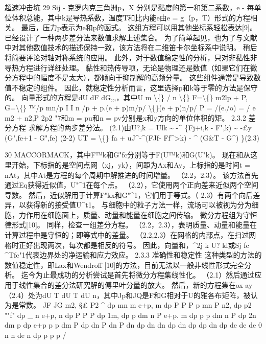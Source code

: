 \documentclass[UTF8,11pt,a4paper,openany,fontset=fandol]{ctexbook}
\begin{document}
超速冲击坑 29 Sij - 克罗内克三角洲p，X 分别是黏度的第一和第二系数，e - 每单位体积总能，其中k是导热系数，温度T和比内能e由e = g（p，T）形式的方程相关。 最后，压力p表示为e和p的函式。 这组方程可以用其他坐标系轻松表达[9]。 已经设计了一种两步差分法来数值求解上述集合。 为了简单起见，也为了与文献中对其他数值技术的描述保持一致，该方法将在二维笛卡尔坐标系中说明。 稍后将简要评论对轴对称系统的应用。 此外，对于数值稳定性的分析，只对非黏性非导热方程进行详细处理。 黏性和热传导项，无论是物理还是数值（如果它们在微分方程中的幅度不是太大），都倾向于抑制解的高频分量。 这些组件通常是导致数值不稳定的组件。 因此，就稳定性分析而言，这里选择p和k等于零的方法是保守的。 向量形式的方程是dU dF dG,„，其中U m \textbackslash\{\} / n \textbackslash\{\} F=\textbackslash\{\} m2lp + P, G=\textbackslash\{\} ™/p mn/p I I n /p + p.(e + p)m/p/ \textbackslash\{\}(e + p)n/p/ P = /(e./o) = / e m2 + n2,P 2p2 "7和m = pu和n = pv分别是x和y方向的单位体积的矩。 2.3.2 差分方程 求解方程的两步差分法。 (2.1)由U?,k = Ulk \textasciitilde{} -\textasciicircum{} \{Fj+i,k - F",k) \textasciitilde{} -£y (G",fe+1 - G",fe) (2-2) UT = \textbackslash\{\} fa + uJ\textasciicircum{}-\textasciicircum{}(FJf- Ff\textasciicircum{}>k) - \textasciicircum{} (G\&T - G\textasciicircum{}) \}(2.3)

30 MACCORMACK，其中F™k和G"fc分别等于F(U™k)和G(U"k)。 现在和从这里开始，下标指的是空间点网（xj，yk），间距为Ax和Ay，上标指的是时间t = nAt，其中At是方程的每个周期中解推进的时间增量。 （2.2，2.3）。 该方法首先通过Eq获得近似值，U"\textasciicircum{}1在每个点。 （2.2），它使用两个正向差来近似两个空间导数。 然后，近似解用于计算F"kx和G"\textasciicircum{}1，它们用于等式。（ 2.3）有两个向后差异，以获得新的接受值U\textasciicircum{}t1。 与细胞中的粒子方法一样，流场可以被视为分为细胞，力作用在细胞面上，质量、动量和能量在细胞之间传输。 微分方程组为守恒律形式[10]。 同样，检查一组差分方程。 （2.2，2.3），表明质量、动量和能量在计算过程中是守恒的；即等式中的差量。 （2.2,2.3）在网格的内部点，在扫过网格时正好出现两次，每次都是相反的符号。 因此，向量和，\textasciicircum{}2j k U? kl或Sj fc \textasciicircum{}Tfc"1代表边界处的净运输和应力效应。 2.3.3 准确性和稳定性 这种类型的方法的数值稳定性，即Lax和Wendroff [10]的方法，目前无法以一般非线性形式完全分析。 迄今为止最成功的分析尝试是首先将微分方程集线性化。 （2.1）然后通过应用于线性集合的差分法研究解的傅里叶分量的放大。 然后，新的方程集在ox ay（2.4）处为dU T dU T dU n，其中Jp和JQ是F和G相对于U的雅各布矩阵，被认为是常数。 JF JG m2, §£ P2 \textasciicircum{} dp mn m e+p, m dp P P P p mn P n2, dp p2 ""f" dp \_ n e+p, n dp P P P dp 1m, dp p dm n P e+p. m dp p p dm n P dp 2n dm p dp e+p p p dm P dp dn P dn P dn dp dn dn dp dn dp dp dn dp de de de 0 n n de n dp p p p /
\end{document}
